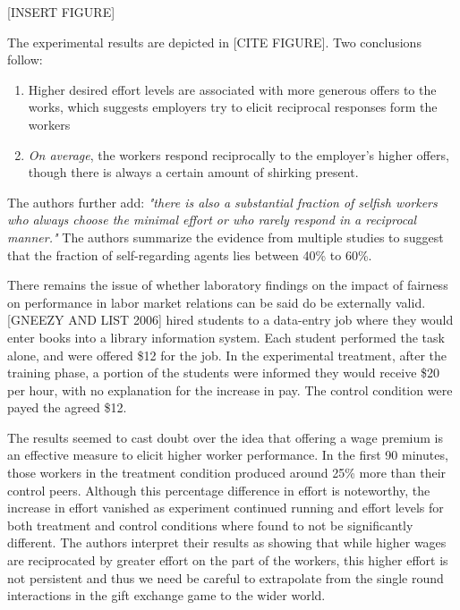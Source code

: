 \message{ !name(tese.tex)}\documentclass{article}
\begin{document}
[INSERT FIGURE]



The experimental results are depicted in [CITE FIGURE]. Two conclusions follow:

\begin{enumerate}

\item Higher desired effort levels are associated with more generous offers to the works, which suggests employers try to elicit reciprocal responses form the workers
\item \textit{On average}, the workers respond reciprocally to the employer's higher offers, though there is always a certain amount of shirking present.

\end{enumerate}

The authors further add: \textit{"there is also a substantial fraction of selfish workers who always choose the minimal effort or who rarely respond in a reciprocal manner."} The authors summarize the evidence from multiple studies to suggest that the fraction of self-regarding agents lies between 40\% to 60\%.


There remains the issue of whether laboratory findings on the impact of fairness on performance in labor market relations can be said do be externally valid.  [GNEEZY AND LIST 2006] hired students to a data-entry job where they would enter books into a library information system. Each student performed the task alone, and were offered \$12 for the job. In the experimental treatment, after the training phase, a portion of the students were informed they would receive \$20 per hour, with no explanation for the increase in pay. The control condition were payed the agreed \$12. 

The results seemed to cast doubt over the idea that offering a wage premium is an effective measure to elicit higher worker performance. In the first 90 minutes, those workers in the treatment condition produced around 25\% more than their control peers. Although this percentage difference in effort is noteworthy, the increase in effort vanished as experiment continued running and effort levels for both treatment and control conditions where found to not be significantly different. The authors interpret their results as showing that while higher wages are reciprocated by greater effort on the part of the workers, this higher effort is not persistent and thus we need be careful to extrapolate from the single round interactions in the gift exchange game to the wider world. 
\end{document}
